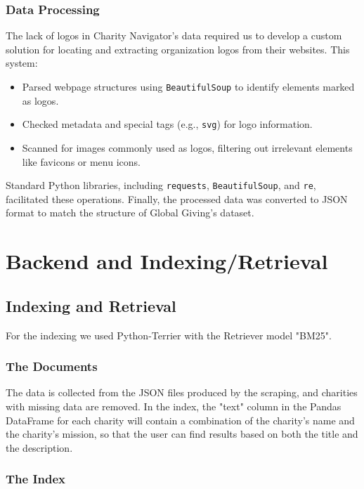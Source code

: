 \documentclass[unicode,9pt,a4paper,oneside,numbers=endperiod,openany]{scrartcl}
\begin{document}
\subsubsection{Data Processing}
The lack of logos in Charity Navigator's data required us to develop a custom solution for locating and extracting organization logos from their websites. This system:
\begin{itemize}
    \item Parsed webpage structures using \texttt{BeautifulSoup} to identify elements marked as logos.
    \item Checked metadata and special tags (e.g., \texttt{svg}) for logo information.
    \item Scanned for images commonly used as logos, filtering out irrelevant elements like favicons or menu icons.
\end{itemize}
Standard Python libraries, including \texttt{requests}, \texttt{BeautifulSoup}, and \texttt{re}, facilitated these operations. Finally, the processed data was converted to JSON format to match the structure of Global Giving's dataset.

\section{Backend and Indexing/Retrieval}

\subsection{Indexing and Retrieval}

For the indexing we used Python-Terrier with the Retriever model "BM25".

\subsubsection{The Documents}

The data is collected from the JSON files produced by the scraping, and charities with missing data are removed.
In the index, the "text" column in the Pandas DataFrame for each charity will contain a combination of the charity's name and the charity's mission, so that the user can find results based on both the title and the description.

\subsubsection{The Index}
\end{document}
